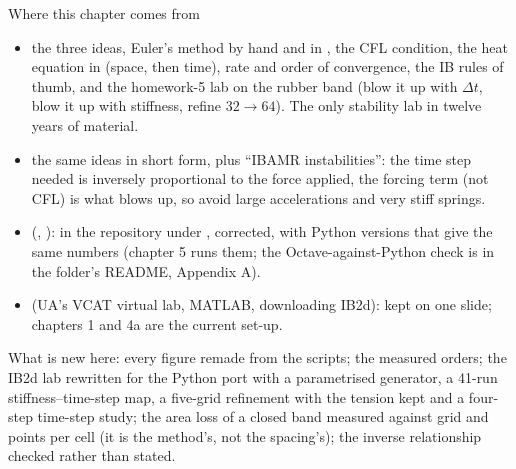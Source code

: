 \documentclass[aspectratio=169,11pt]{beamer}
\begin{document}
\begin{frame}{Where this chapter comes from}
\label{fr:sources}
\footnotesize
\begin{itemize}
  \item {} the three ideas, Euler's method by hand and in , the CFL condition, the heat equation in  (space, then time), rate and order of convergence, the IB rules of thumb, and the homework-5 lab on the rubber band (blow it up with $\Delta t$, blow it up with stiffness, refine $32 \to 64$). The only stability lab in twelve years of material.
  \item {} the same ideas in short form, plus ``IBAMR instabilities'': the time step needed is inversely proportional to the force applied, the forcing term (not CFL) is what blows up, so avoid large accelerations and very stiff springs.
  \item {} (, ): in the repository under , corrected, with Python versions that give the same numbers (chapter 5 runs them; the Octave-against-Python check is in the folder's README, Appendix A).
  \item {} (UA's VCAT virtual lab, MATLAB, downloading IB2d): kept on one slide; chapters 1 and 4a are the current set-up.
\end{itemize}
What is new here: every figure remade from the scripts; the measured orders; the IB2d lab rewritten for the Python port with a parametrised generator, a 41-run stiffness--time-step map, a five-grid refinement with the tension kept and a four-step time-step study; the area loss of a closed band measured against grid and points per cell (it is the method's, not the spacing's); the inverse relationship checked rather than stated.
\end{frame}
\end{document}
